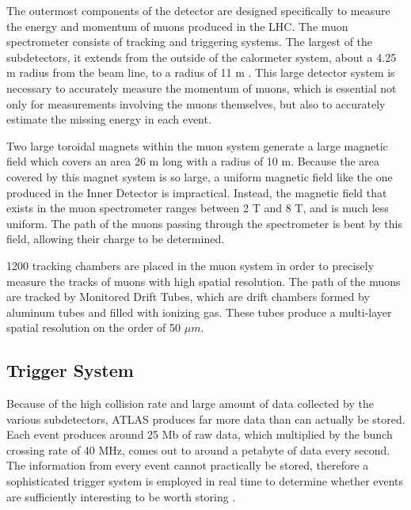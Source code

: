 The outermost components of the detector are designed specifically to measure the energy and momentum of muons produced in the LHC. The muon spectrometer consists of tracking and triggering systems. The largest of the subdetectors, it extends from the outside of the calormeter system, about a 4.25 m radius from the beam line, to a radius of 11 m \cite{MUON-2010-01}. This large detector system is necessary to accurately measure the momentum of muons, which is essential not only for measurements involving the muons themselves, but also to accurately estimate the missing energy in each event.

Two large toroidal magnets within the muon system generate a large magnetic field which covers an area 26 m long with a radius of 10 m. Because the area covered by this magnet system is so large, a uniform magnetic field like the one produced in the Inner Detector is impractical. Instead, the magnetic field that exists in the muon spectrometer ranges between 2 T and 8 T, and is much less uniform. The path of the muons passing through the spectrometer is bent by this field, allowing their charge to be determined. 

1200 tracking chambers are placed in the muon system in order to precisely measure the tracks of muons with high spatial resolution. The path of the muons are tracked by Monitored Drift Tubes, which are drift chambers formed by aluminum tubes and filled with ionizing gas. These tubes produce a multi-layer spatial resolution on the order of 50 $\mu m$.


\subsection{Trigger System}
\label{sec:trigger}

Because of the high collision rate and large amount of data collected by the various subdetectors, ATLAS produces far more data than can actually be stored. Each event produces around 25 Mb of raw data, which multiplied by the bunch crossing rate of 40 MHz, comes out to around a petabyte of data every second. The information from every event cannot practically be stored, therefore a sophisticated trigger system is employed in real time to determine whether events are sufficiently interesting to be worth storing \cite{PERF-2011-02}.

